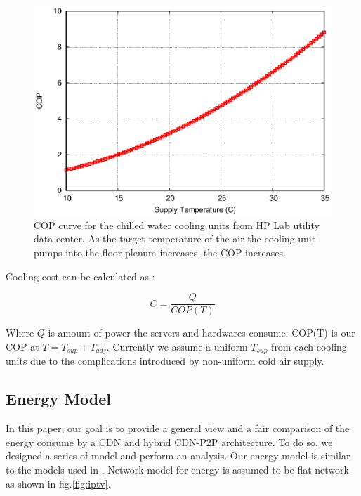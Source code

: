 \documentclass[JIP]{ipsj}
\begin{document}
\begin{figure}[thb]
\begin{center}
\includegraphics[scale=0.6]{graphs/cop.eps}
\end{center}
\caption{COP curve for the chilled water cooling units from HP Lab utility data center.
As the target temperature of the air the cooling unit pumps into the floor plenum increases, the COP increases.}
\label{fig:twotier}
\end{figure} 

Cooling cost can be calculated as  \cite{moore2005making} :

\begin{equation}\label{eqn:cost}
C = \frac{Q}{COP(T)}
\end{equation}

Where $Q$ is amount of power the servers and hardwares consume.
COP(T) is our COP at $T=T_{sup}+T_{adj}$.
Currently we assume a uniform $T_{sup}$ from each cooling units due to the complications introduced by non-uniform cold air supply.


\subsection{Energy Model}\label{energy model}
In this paper, our goal is to provide a general view and a fair comparison of the energy consume by a CDN and hybrid CDN-P2P architecture. 
To do so, we designed a series of model and perform an analysis.
Our energy model is similar to the models used in \cite{Nedevschi:2008:HDC:1855610.1855618}.
Network model for energy is assumed to be flat network as shown in fig.\ref{fig:iptv}.
\end{document}
